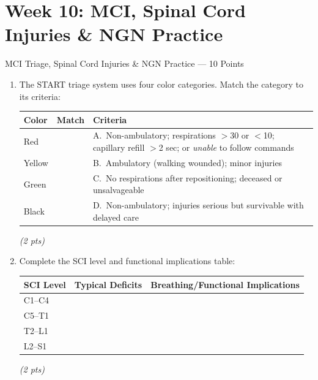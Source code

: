 \documentclass[11pt,letterpaper]{article}
\newcommand{\blank}[1][3cm]{\underline{\hspace{#1}}}
\begin{document}
\newpage

\section{Week 10: MCI, Spinal Cord Injuries \& NGN Practice}

\begin{diagbox}{MCI Triage, Spinal Cord Injuries \& NGN Practice --- 10 Points}

\begin{enumerate}[leftmargin=1.5em, label=\textbf{\arabic*.},start=101]

  \item The START triage system uses four color categories.  Match the category to its criteria:

  \vspace{0.2cm}
  \begin{center}
  \renewcommand{\arraystretch}{1.6}
  \begin{tabular}{|p{2cm}|p{1.5cm}|p{7cm}|}
  \hline
  \textbf{Color} & \textbf{Match} & \textbf{Criteria} \\
  \hline
  Red    & \blank[1.2cm] & A.\ Non-ambulatory; respirations $>$30 or $<$10; capillary refill $>$2 sec; or \emph{unable} to follow commands \\
  \hline
  Yellow & \blank[1.2cm] & B.\ Ambulatory (walking wounded); minor injuries \\
  \hline
  Green  & \blank[1.2cm] & C.\ No respirations after repositioning; deceased or unsalvageable \\
  \hline
  Black  & \blank[1.2cm] & D.\ Non-ambulatory; injuries serious but survivable with delayed care \\
  \hline
  \end{tabular}
  \end{center}
  \hfill\textit{(2 pts)}

  \item Complete the SCI level and functional implications table:

  \vspace{0.2cm}
  \begin{center}
  \renewcommand{\arraystretch}{1.6}
  \begin{tabular}{|p{2.5cm}|p{4.5cm}|p{4.5cm}|}
  \hline
  \textbf{SCI Level} & \textbf{Typical Deficits} & \textbf{Breathing/Functional Implications} \\
  \hline
  C1--C4  & \blank[4cm] & \blank[4cm] \\
  \hline
  C5--T1  & \blank[4cm] & \blank[4cm] \\
  \hline
  T2--L1  & \blank[4cm] & \blank[4cm] \\
  \hline
  L2--S1  & \blank[4cm] & \blank[4cm] \\
  \hline
  \end{tabular}
  \end{center}
  \hfill\textit{(2 pts)}


\end{enumerate}
\end{diagbox}
\end{document}

